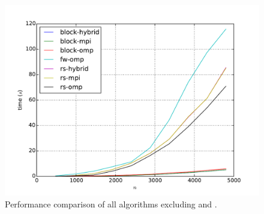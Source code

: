 \begin{figure}
  \centering
  \includegraphics[width=\textwidth]{plots/all.pdf}
  \caption{%
    Performance comparison of all algorithms excluding \fwmpi{} and \fwhybrid{}.
  }
  \label{fig:perf}
\end{figure}
